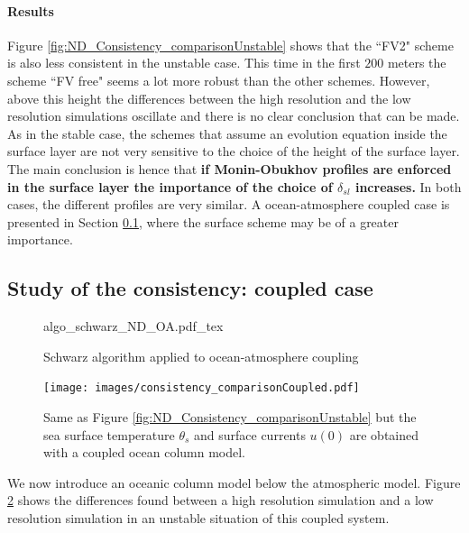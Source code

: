 \paragraph{Results}
Figure \ref{fig:ND_Consistency_comparisonUnstable}
shows that the ``FV2" scheme is also less consistent
in the unstable case.
This time in the first $200$ meters the scheme ``FV free" seems a lot
more robust than the other schemes.
However, above this height the differences between the high
resolution and the low resolution simulations oscillate and there
is no clear conclusion that can be made.
As in the stable case, the schemes that assume an evolution equation
inside the surface layer are not very sensitive to the choice of
the height of the surface layer.
The main conclusion is hence that
\textbf{if Monin-Obukhov profiles are enforced in the
surface layer the importance of the choice of
$\delta_{sl}$ increases.}
In both cases, the different profiles are very similar.
A ocean-atmosphere coupled case is presented in Section
\ref{sec:ND_Consistency_Coupled}, where the surface scheme may be of a greater
importance.
\subsection{Study of the consistency: coupled case}
\label{sec:ND_Consistency_Coupled}
\begin{figure}
	\centering
	{algo_schwarz_ND_OA.pdf_tex}
	\caption{Schwarz algorithm applied to ocean-atmosphere
		coupling}
	\label{fig:ND_Consistency_schwarz_algo}
\end{figure}
\begin{figure}
	\centering
	\texttt{[image: images/consistency\_comparisonCoupled.pdf]}
	\caption{Same as Figure
	\ref{fig:ND_Consistency_comparisonUnstable} but the sea
	surface temperature $\theta_s$ and surface currents
	$u(0)$ are obtained with a coupled ocean column model.}
	\label{fig:ND_Consistency_comparisonCoupled}
\end{figure}
We now introduce an oceanic column model below the
atmospheric model.
Figure \ref{fig:ND_Consistency_comparisonCoupled}
shows the differences found between a high resolution simulation
and a low resolution simulation in an unstable situation of
this coupled system.
